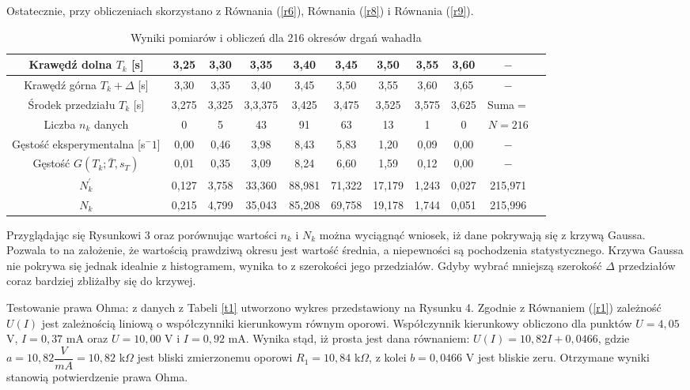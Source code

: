 \documentclass[10pt,a4paper]{article}
\begin{document}
  Ostatecznie, przy obliczeniach skorzystano z Równania (\ref{r6}), Równania (\ref{r8}) i  Równania (\ref{r9}).
  \begin{center}
 \begin{table}[h!]
 \centering
 \caption{Wyniki pomiarów i obliczeń dla 216 okresów drgań wahadła}
 \label{t5}
 \begin{tabular}{|c|c|c|c|c|c|c|c|c|c|c|}
 \hline
 Krawędź dolna $T_{k}$ [s]&3,25&3,30&3,35&3,40&3,45&3,50&3,55&3,60&$-$ \\
 \hline
 Krawędź górna $T_{k}+\Delta$ [s]&3,30&3,35&3,40&3,45&3,50&3,55&3,60&3,65&$-$ \\
 \hline 
 Środek przedziału $T_{k}$ [s]& 3,275&3,325&3,3,375&3,425&3,475&3,525&3,575&3,625&Suma$=$\\
 \hline
 Liczba $n_{k}$ danych&0&5&43&91&63&13&1&0&$N=216$\\
 \hline
 Gęstość eksperymentalna [s$^-1$]& 0,00&0,46&3,98&8,43&5,83&1,20&0,09&0,00&$-$\\
 \hline
 Gęstość $G\left(T_{k};\bar{T},s_{T}\right)$&0,01&0,35&3,09&8,24&6,60&1,59&0,12&0,00&$-$\\
 \hline
 $N_{k}^{'}$&0,127&3,758&33,360&88,981&71,322&17,179&1,243&0,027&215,971\\
 \hline
 $N_{k}$&0,215&4,799&35,043&85,208&69,758&19,178&1,744&0,051&215,996\\
 \hline
 \end{tabular}
 \end{table}
 \end{center}
 Przyglądając się Rysunkowi 3 oraz porównując wartości $n_{k}$ i $N_{k}$ można wyciągnąć wniosek, iż dane pokrywają się z krzywą Gaussa. Pozwala to na założenie, że wartością prawdziwą okresu jest wartość średnia, a niepewności są pochodzenia statystycznego. Krzywa Gaussa nie pokrywa się jednak idealnie z histogramem, wynika to z szerokości jego przedziałów. Gdyby wybrać mniejszą szerokość $\Delta$ przedziałów coraz bardziej zbliżałby się do krzywej.
 
 Testowanie prawa Ohma: z danych z Tabeli \ref{t1} utworzono wykres przedstawiony na Rysunku 4. Zgodnie z Równaniem (\ref{r1}) zależność $U(I)$ jest zależnością liniową o współczynniki kierunkowym równym oporowi. Współczynnik kierunkowy obliczono dla punktów $U=4,05$ V, $I=0,37$ mA oraz $U=10,00$ V i $I=0,92$ mA. Wynika stąd, iż prosta jest dana równaniem: $U(I)=10,82I+0,0466$, gdzie $a=10,82\dfrac{V}{mA}=10,82$ k$\Omega$ jest bliski zmierzonemu oporowi $R_{1}=10,84$ k$\Omega$, z kolei $b=0,0466$ V jest bliskie zeru. Otrzymane wyniki stanowią potwierdzenie prawa Ohma. 
 
\end{document}
